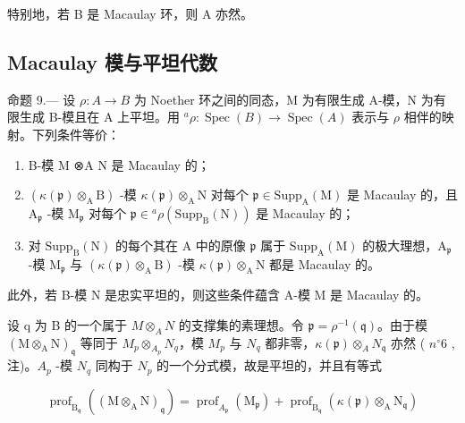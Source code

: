 特别地，若 B 是 Macaulay 环，则 A 亦然。

\subsection{Macaulay 模与平坦代数}

命题 9.— 设 \(\rho: A \to B\) 为 Noether 环之间的同态，M 为有限生成 A-模，N 为有限生成 B-模且在 A 上平坦。用 \({}^{a}\rho: \operatorname{Spec}(B) \longrightarrow \operatorname{Spec}(A)\) 表示与 \(\rho\) 相伴的映射。下列条件等价：

\begin{enumerate}
\def\labelenumi{(\roman{enumi})}
\item
  B-模 M ⊗A N 是 Macaulay 的；
\item
  \((\kappa(\mathfrak{p})\otimes_{\mathrm{A}}\mathrm{B})\) -模 \(\kappa(\mathfrak{p})\otimes_{\mathrm{A}}\mathrm{N}\) 对每个 \(\mathfrak{p}\in\mathrm{Supp}_{\mathrm{A}}(\mathrm{M})\) 是 Macaulay 的，且 \(\mathrm{A}_{\mathfrak{p}}\) -模 \(\mathrm{M}_{\mathfrak{p}}\) 对每个 \(\mathfrak{p}\in{}^{a}\rho(\mathrm{Supp}_{\mathrm{B}}(\mathrm{N}))\) 是 Macaulay 的；
\item
  对 \(\mathrm{Supp}_{\mathrm{B}}(\mathrm{N})\) 的每个其在 A 中的原像 \(\mathfrak{p}\) 属于 \(\mathrm{Supp}_{\mathrm{A}}(\mathrm{M})\) 的极大理想，\(\mathrm{A}_{\mathfrak{p}}\) -模 \(\mathrm{M}_{\mathfrak{p}}\) 与 \((\kappa(\mathfrak{p}) \otimes_{\mathrm{A}} \mathrm{B})\) -模 \(\kappa(\mathfrak{p}) \otimes_{\mathrm{A}} \mathrm{N}\) 都是 Macaulay 的。
\end{enumerate}

此外，若 B-模 N 是忠实平坦的，则这些条件蕴含 A-模 M 是 Macaulay 的。

设 q 为 B 的一个属于 \(M \otimes_{A} N\) 的支撑集的素理想。令 \(\mathfrak{p} = \rho^{-1}(\mathfrak{q})\)。由于模 \((\mathrm{M} \otimes_{\mathrm{A}} \mathrm{N})_{\mathfrak{q}}\) 等同于 \(M_{p} \otimes_{A_{p}} N_{q}\)，模 \(M_{p}\) 与 \(N_{q}\) 都非零，\(\kappa(\mathfrak{p}) \otimes_{A} N_{\mathfrak{q}}\) 亦然 ( \(n^{\circ} 6\) , 注)。\(A_{p}\) -模 \(N_{q}\) 同构于 \(N_{p}\) 的一个分式模，故是平坦的，并且有等式

\[
\operatorname{prof} _ {\mathrm{B} _ {\mathfrak {q}}} \left(\left(\mathrm{M} \otimes_ {\mathrm{A}} \mathrm{N}\right) _ {\mathfrak {q}}\right) = \operatorname{prof} _ {A_ {\mathfrak {p}}} \left(\mathrm{M} _ {\mathfrak {p}}\right) + \operatorname{prof} _ {\mathrm{B} _ {\mathfrak {q}}} (\kappa (\mathfrak {p}) \otimes_ {\mathrm{A}} \mathrm{N} _ {\mathfrak {q}})
\]

